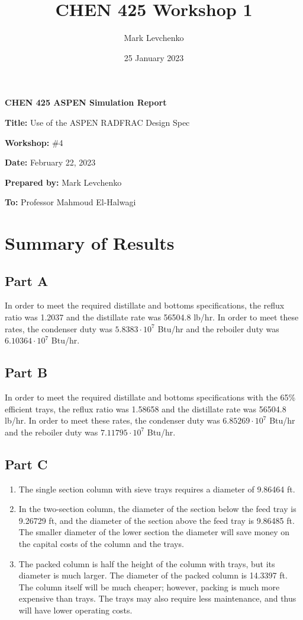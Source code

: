 \documentclass[12pt]{article}
\title{CHEN 425 Workshop 1}
\author{Mark Levchenko}
\date{25 January 2023}
\begin{document}

\textbf{CHEN 425 ASPEN Simulation Report}

\textbf{Title:} Use of the ASPEN RADFRAC Design Spec

\textbf{Workshop:} \#4

\textbf{Date:} February 22, 2023

\textbf{Prepared by:} Mark Levchenko

\textbf{To:} Professor Mahmoud El-Halwagi


\section{Summary of Results}
\subsection{Part A}
In order to meet the required distillate and bottoms specifications, the reflux ratio was 1.2037 and the distillate rate was 56504.8 lb/hr. In order to meet these rates, the condenser duty was $5.8383\cdot10^7$ Btu/hr and the reboiler duty was $6.10364\cdot10^7$ Btu/hr.

\subsection{Part B}
In order to meet the required distillate and bottoms specifications with the 65\% efficient trays, the reflux ratio was 1.58658 and the distillate rate was 56504.8 lb/hr. In order to meet these rates, the condenser duty was $6.85269\cdot10^7$ Btu/hr and the reboiler duty was $7.11795\cdot10^7$ Btu/hr.

\subsection{Part C}
\begin{enumerate}
    \item The single section column with sieve trays requires a diameter of 9.86464 ft.
    \item In the two-section column, the diameter of the section below the feed tray is 9.26729 ft, and the diameter of the section above the feed tray is 9.86485 ft. The smaller diameter of the lower section the diameter will save money on the capital costs of the column and the trays.
    \item The packed column is half the height of the column with trays, but its diameter is much larger. The diameter of the packed column is 14.3397 ft. The column itself will be much cheaper; however, packing is much more expensive than trays. The trays may also require less maintenance, and thus will have lower operating costs.
\end{enumerate}
\end{document}
